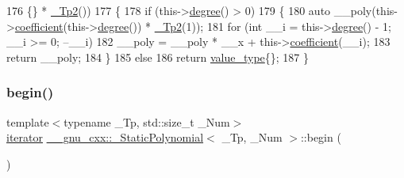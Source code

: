 \begin{DoxyCode}
176                               \{\} * \hyperlink{class____gnu__cxx_1_1__StaticPolynomial_a111ee5aedd5ae8c0b4d8fa8f29d1f9b9}{\_Tp2}())
177         \{
178           \textcolor{keywordflow}{if} (this->\hyperlink{class____gnu__cxx_1_1__StaticPolynomial_a56b1719601ce049e6dd768e10edfd171}{degree}() > 0)
179             \{
180               \textcolor{keyword}{auto} \_\_poly(this->\hyperlink{class____gnu__cxx_1_1__StaticPolynomial_a412fc570171031ff0f45db048dfda225}{coefficient}(this->\hyperlink{class____gnu__cxx_1_1__StaticPolynomial_a56b1719601ce049e6dd768e10edfd171}{degree}()) * 
      \hyperlink{class____gnu__cxx_1_1__StaticPolynomial_a111ee5aedd5ae8c0b4d8fa8f29d1f9b9}{\_Tp2}(1));
181               \textcolor{keywordflow}{for} (\textcolor{keywordtype}{int} \_\_i = this->\hyperlink{class____gnu__cxx_1_1__StaticPolynomial_a56b1719601ce049e6dd768e10edfd171}{degree}() - 1; \_\_i >= 0; --\_\_i)
182                 \_\_poly = \_\_poly * \_\_x + this->\hyperlink{class____gnu__cxx_1_1__StaticPolynomial_a412fc570171031ff0f45db048dfda225}{coefficient}(\_\_i);
183               \textcolor{keywordflow}{return} \_\_poly;
184             \}
185           \textcolor{keywordflow}{else}
186             \textcolor{keywordflow}{return} \hyperlink{class____gnu__cxx_1_1__StaticPolynomial_af23110f5a002cd6caa3542df7cf35284}{value\_type}\{\};
187         \}
\end{DoxyCode}
\mbox{\label{class____gnu__cxx_1_1__StaticPolynomial_a816ba3452f7919f8640eb429b4b2501d}} 
\subsubsection{\texorpdfstring{begin()}{begin()}\hspace{0.1cm}{\footnotesize\ttfamily [1/2]}}
{\footnotesize\ttfamily template$<$typename \+\_\+\+Tp, std\+::size\+\_\+t \+\_\+\+Num$>$ \\
\hyperlink{class____gnu__cxx_1_1__StaticPolynomial_ac52661d1503c79a7c5c90426cd0ac41e}{iterator} \hyperlink{class____gnu__cxx_1_1__StaticPolynomial}{\+\_\+\+\_\+gnu\+\_\+cxx\+::\+\_\+\+Static\+Polynomial}$<$ \+\_\+\+Tp, \+\_\+\+Num $>$\+::begin (\begin{DoxyParamCaption}{ }\end{DoxyParamCaption})\hspace{0.3cm}{\ttfamily [inline]}}



